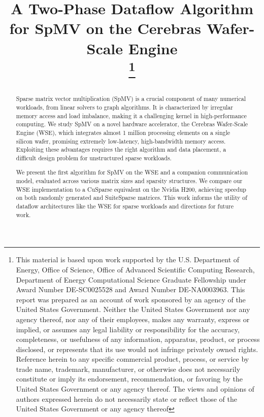 \documentclass[conference]{IEEEtran}
\newif\ifanon
\begin{document}
\title{A Two-Phase Dataflow Algorithm for SpMV on the Cerebras Wafer-Scale Engine\\
    \ifanon
    \else
        \thanks{This material is based upon work supported by the U.S. Department of
            Energy, Office of Science, Office of Advanced Scientific Computing Research, Department of
            Energy Computational Science Graduate Fellowship under Award Number DE-SC0025528 and Award Number DE-NA0003963. This report was prepared as an account of work sponsored by an agency of the
            United States Government. Neither the United States Government nor any agency thereof, nor
            any of their employees, makes any warranty, express or implied, or assumes any legal liability
            or responsibility for the accuracy, completeness, or usefulness of any information, apparatus,
            product, or process disclosed, or represents that its use would not infringe privately owned
            rights. Reference herein to any specific commercial product, process, or service by trade name,
            trademark, manufacturer, or otherwise does not necessarily constitute or imply its
            endorsement, recommendation, or favoring by the United States Government or any agency
            thereof. The views and opinions of authors expressed herein do not necessarily state or reflect
            those of the United States Government or any agency thereof
        }
    \fi
}
\ifanon
\else
    \author{
        }
\fi

\maketitle
\begin{abstract}
    Sparse matrix vector multiplication (SpMV) is a crucial component of many numerical workloads, from linear solvers to graph algorithms. It is characterized by irregular memory access and load imbalance, making it a challenging kernel in high-performance computing.
    We study SpMV on a novel hardware accelerator, the Cerebras Wafer-Scale Engine (WSE), which integrates almost 1 million processing elements on a single silicon wafer, promising extremely low-latency, high-bandwidth memory access. Exploiting these advantages requires the right algorithm and data placement, a difficult design problem for unstructured sparse workloads.

    We present the first algorithm for SpMV on the WSE and a companion communication model, evaluated across various matrix sizes and sparsity structures. We compare our WSE implementation to a CuSparse equivalent on the Nvidia H200, achieving speedup on both randomly generated and SuiteSparse matrices. This work informs the utility of dataflow architectures like the WSE for sparse workloads and directions for future work.
\end{abstract}
\end{document}
